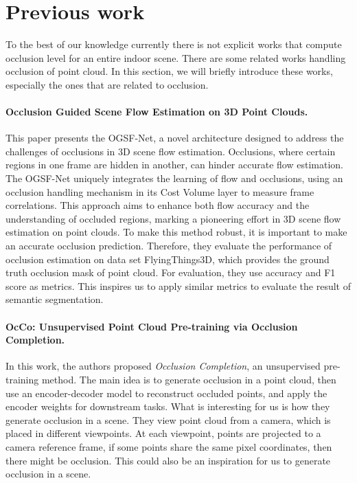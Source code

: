 \documentclass[11pt, a4paper,oneside,chapterprefix=false]{scrbook}
\begin{document}
\section{Previous work}
To the best of our knowledge currently there is not explicit works that compute occlusion level for an entire indoor scene. There are some related works handling occlusion of point cloud. In this section, we will briefly introduce these works, especially the ones that are related to occlusion.  


\paragraph{Occlusion Guided Scene Flow Estimation on 3D Point Clouds.} \label{par:scene flow}

This paper presents the OGSF-Net, a novel architecture designed to address the challenges of occlusions in 3D scene flow estimation. Occlusions, where certain regions in one frame are hidden in another, can hinder accurate flow estimation. The OGSF-Net uniquely integrates the learning of flow and occlusions, using an occlusion handling mechanism in its Cost Volume layer to measure frame correlations. This approach aims to enhance both flow accuracy and the understanding of occluded regions, marking a pioneering effort in 3D scene flow estimation on point clouds. To make this method robust, it is important to make an accurate occlusion prediction. Therefore, they evaluate the performance of occlusion estimation on data set FlyingThings3D, which provides the ground truth occlusion mask of point cloud. For evaluation, they use accuracy and F1 score as metrics. This inspires us to apply similar metrics to evaluate the result of semantic segmentation.

\paragraph{OcCo: Unsupervised Point Cloud Pre-training via Occlusion Completion.} \label{par:OcCo occlusion completion}

In this work, the authors proposed \emph{Occlusion Completion}, an unsupervised pre-training method. The main idea is to generate occlusion in a point cloud, then use an encoder-decoder model to reconstruct occluded points, and apply the encoder weights for downstream tasks. What is interesting for us is how they generate occlusion in a scene. They view point cloud from a camera, which is placed in different viewpoints. At each viewpoint, points are projected to a camera reference frame, if some points share the same pixel coordinates, then there might be occlusion. This could also be an inspiration for us to generate occlusion in a scene.
\end{document}
